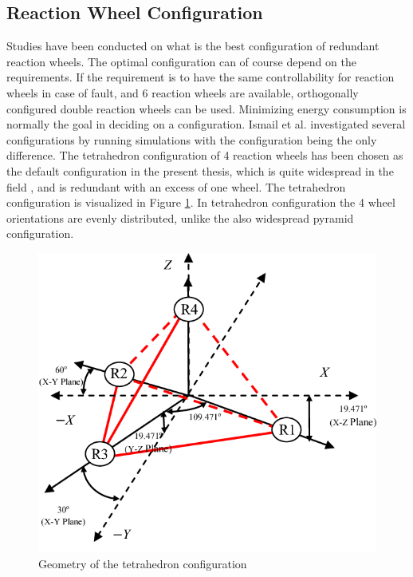 \subsection{Reaction Wheel Configuration}
\label{ref:reactConfig}

Studies have been conducted on what is the best configuration of redundant reaction wheels. The optimal configuration can of course depend on the requirements. If the requirement is to have the same controllability for reaction wheels in case of fault, and 6 reaction wheels are available, orthogonally configured double reaction wheels can be used. Minimizing energy consumption is normally the goal in deciding on a configuration. Ismail et al. \cite{ReactionWheelConfigSim} investigated several configurations by running simulations with the configuration being the only difference. The tetrahedron configuration of 4 reaction wheels has been chosen as the default configuration in the present thesis, which is quite widespread in the field \cite{reactConfigNasa}, and is redundant with an excess of one wheel. The tetrahedron configuration is visualized in Figure \ref{fig:tetrahedron}.
In tetrahedron configuration the 4 wheel orientations are evenly distributed, unlike the also widespread pyramid configuration. 

\begin{figure}[H]
	\centering 
	\includegraphics[width=120mm]{figures/tetrahedron}	
	\caption{Geometry of the tetrahedron configuration \cite{Kumar2015DesignAD}}
	\label{fig:tetrahedron}
\end{figure}


